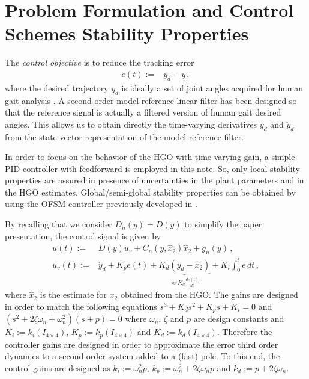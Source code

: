 \documentclass[letterpaper, 10 pt, conference]{ieeeconf}  %
\theoremstyle{plain}
\theoremstyle{definition}
\theoremstyle{remark}
\begin{document}
\section{Problem Formulation and Control Schemes Stability Properties}

The {\em control objective} is to reduce the tracking error 
%
\begin{align}
e(t) := & y_{d} - y\,,
\end{align}
%
where the desired trajectory $y_d$ is ideally a set of joint angles acquired for human gait analysis \cite{Schwartz2008}.  A second-order model reference linear filter %
%
%
has been designed so that the reference signal is actually a filtered version of human gait desired angles. This allows us to obtain directly the  time-varying derivatives $\dot{y}_d$ and $\ddot{y}_d$ from the state vector representation of the model reference filter.

In order to focus on the behavior of the HGO with time varying gain, a simple  PID controller with feedforward is employed  in this note. So, only local stability properties are assured in presence of uncertainties in the plant parameters and in the HGO estimates. Global/semi-global stability properties can be obtained by using the  OFSM controller previously developed in \cite{POH:2011}.

By recalling that we  consider $D_n(y)=D(y)$ to simplify the paper presentation, the control  signal is given by
%
\begin{align}
u(t) := & D(y) u_v + C_{n}(y,\hat{x}_2) \hat{x}_2+g_{n}(y)\,, \\
u_v(t):= &\ddot{y}_d + K_p e(t) + \underbrace{K_d (\dot{y}_d - \hat{x}_2)}_{\approx K_d \frac{de(t)}{dt}} + K_i\int_{0}^{t}e \, dt\,,
\label{eq:defu}
\end{align}
%
where $\hat{x}_2$ is the estimate for $x_2$ obtained from the HGO. The gains are designed in order to match the following equations
$s^3 + K_ds^2 + K_ps + K_i = 0$ and $(s^2 + 2\zeta \omega_n + \omega_n^2)(s + p) = 0$
%
%
where $\omega_n$, $\zeta$ and $p$ are design constants and $K_i := k_i(I_{4 \times 4})$, $K_p := k_p(I_{4 \times 4})$ and $K_d := k_d(I_{4 \times 4})$. Therefore the controller gains are designed in order to approximate the error third order dynamics to a second order system added to a (fast) pole. To this end, the control gains are designed as $k_i := \omega_n^2p$, $k_p := \omega_n^2 + 2\zeta \omega_n p$ and $k_d := p + 2\zeta \omega_n$.
%
%
\end{document}
